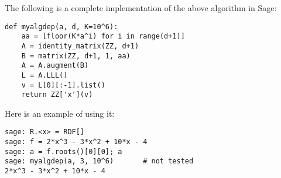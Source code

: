 The following is a complete implementation of the above algorithm
in Sage:
\begin{verbatim}
def myalgdep(a, d, K=10^6):
    aa = [floor(K*a^i) for i in range(d+1)]
    A = identity_matrix(ZZ, d+1)
    B = matrix(ZZ, d+1, 1, aa)
    A = A.augment(B)
    L = A.LLL()
    v = L[0][:-1].list()
    return ZZ['x'](v)
\end{verbatim}

Here is an example of using it:
\begin{verbatim}
sage: R.<x> = RDF[]
sage: f = 2*x^3 - 3*x^2 + 10*x - 4
sage: a = f.roots()[0][0]; a
sage: myalgdep(a, 3, 10^6)       # not tested
2*x^3 - 3*x^2 + 10*x - 4
\end{verbatim}





